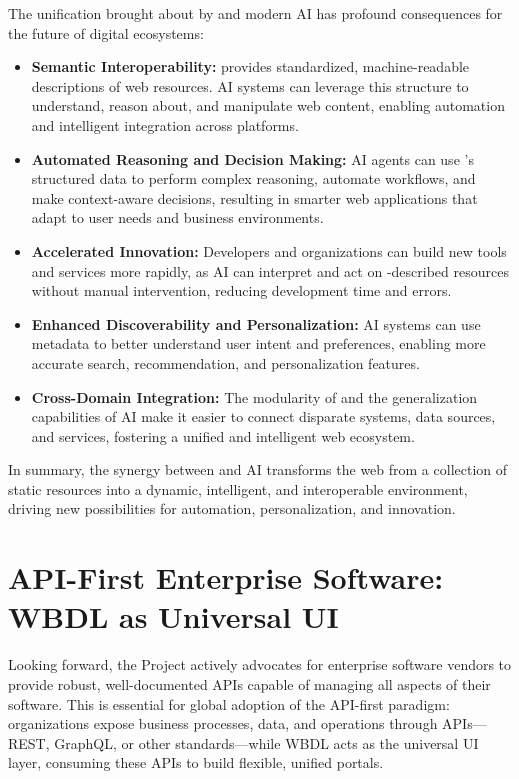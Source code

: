 The unification brought about by \wbdl{} and modern AI has profound consequences for the future of digital ecosystems:
\begin{itemize}
	\item \textbf{Semantic Interoperability:} \wbdl{} provides standardized, machine-readable descriptions of web resources. AI systems can leverage this structure to understand, reason about, and manipulate web content, enabling automation and intelligent integration across platforms.
	\item \textbf{Automated Reasoning and Decision Making:} AI agents can use \wbdl{}'s structured data to perform complex reasoning, automate workflows, and make context-aware decisions, resulting in smarter web applications that adapt to user needs and business environments.
	\item \textbf{Accelerated Innovation:} Developers and organizations can build new tools and services more rapidly, as AI can interpret and act on \wbdl{}-described resources without manual intervention, reducing development time and errors.
	\item \textbf{Enhanced Discoverability and Personalization:} AI systems can use \wbdl{} metadata to better understand user intent and preferences, enabling more accurate search, recommendation, and personalization features.
	\item \textbf{Cross-Domain Integration:} The modularity of \wbdl{} and the generalization capabilities of AI make it easier to connect disparate systems, data sources, and services, fostering a unified and intelligent web ecosystem.
\end{itemize}

In summary, the synergy between \wbdl{} and AI transforms the web from a collection of static resources into a dynamic, intelligent, and interoperable environment, driving new possibilities for automation, personalization, and innovation.

\section{API-First Enterprise Software: WBDL as Universal UI}

Looking forward, the Project actively advocates for enterprise software vendors to provide robust, well-documented APIs capable of managing all aspects of their software. This is essential for global adoption of the API-first paradigm: organizations expose business processes, data, and operations through APIs—REST, GraphQL, or other standards—while WBDL acts as the universal UI layer, consuming these APIs to build flexible, unified portals.

